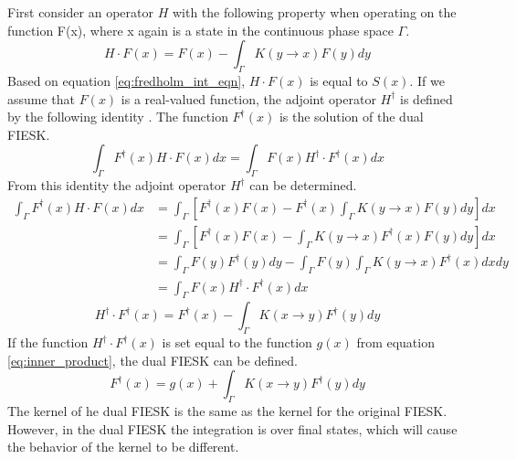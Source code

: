 First consider an operator $H$ with the following property when operating
on the function F(x), where x again is a state in the continuous phase space
$\Gamma$. 
\begin{equation}
  H \cdot F(x) = F(x) - \int_{\Gamma} K(y \to x)F(y)dy
  \label{eq:forward_operator}
\end{equation}
Based on equation \ref{eq:fredholm_int_eqn}, $H \cdot F(x)$ is equal to $S(x)$.
If we assume that $F(x)$ is a real-valued function, the adjoint operator 
$H^{\dagger}$ is defined by the following identity 
\citep{morse_methods_1953}. The function $F^{\dagger}(x)$ is the solution 
of the dual FIESK. 
\begin{equation}
  \int_{\Gamma}F^{\dagger}(x)H \cdot F(x)dx  = 
  \int_{\Gamma}F(x)H^{\dagger} \cdot F^{\dagger}(x)dx
  \label{eq:forward_adjoint_ops}
\end{equation}
From this identity the adjoint operator $H^{\dagger}$ can be determined.
\begin{align}
  \int_{\Gamma} F^{\dagger}(x)H \cdot F(x)dx & = \int_{\Gamma} 
  \left[F^{\dagger}(x)F(x) -
  F^{\dagger}(x)\int_{\Gamma}K(y \to x)F(y)dy \right]dx \nonumber \\
  & = \int_{\Gamma} \left[F^{\dagger}(x)F(x) -
  \int_{\Gamma}K(y \to x)F^{\dagger}(x)F(y)dy \right]dx \nonumber \\
  & = \int_{\Gamma} F(y)F^{\dagger}(y)dy - 
  \int_{\Gamma}F(y)\int_{\Gamma}K(y \to x)F^{\dagger}(x)dxdy \nonumber \\
  & = \int_{\Gamma}F(x)H^{\dagger} \cdot F^{\dagger}(x)dx \nonumber
\end{align}
\begin{equation}
  H^{\dagger} \cdot F^{\dagger}(x) = F^{\dagger}(x) - 
  \int_{\Gamma}K(x \to y)F^{\dagger}(y)dy
  \label{eq:adjoint_operator}
\end{equation}
If the function $H^{\dagger} \cdot F^{\dagger}(x)$ is set equal to the function
$g(x)$ from equation \ref{eq:inner_product}, the dual FIESK can be defined.
\begin{equation}
  F^{\dagger}(x) = g(x) + \int_{\Gamma}K(x \to y)F^{\dagger}(y)dy 
  \label{eq:dual_fredholm_int_eqn}
\end{equation}
The kernel of he dual FIESK is the same as the kernel for the original FIESK. 
However, in the dual FIESK the integration is over final states, which will 
cause the behavior of the kernel to be different.

